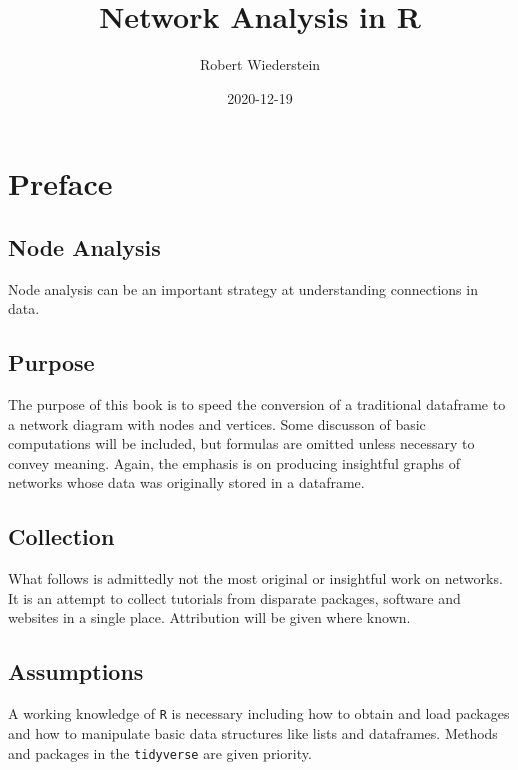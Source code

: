 \documentclass[]{book}
\title{Network Analysis in R}
\author{Robert Wiederstein}
\date{2020-12-19}
\begin{document}
\maketitle

{
\setcounter{tocdepth}{1}
\tableofcontents
}
\hypertarget{preface}{%
\chapter*{Preface}\label{preface}}

\hypertarget{node-analysis}{%
\section{Node Analysis}\label{node-analysis}}

Node analysis can be an important strategy at understanding connections in data.

\hypertarget{purpose}{%
\section{Purpose}\label{purpose}}

The purpose of this book is to speed the conversion of a traditional dataframe to a network diagram with nodes and vertices. Some discusson of basic computations will be included, but formulas are omitted unless necessary to convey meaning. Again, the emphasis is on producing insightful graphs of networks whose data was originally stored in a dataframe.

\hypertarget{collection}{%
\section{Collection}\label{collection}}

What follows is admittedly not the most original or insightful work on networks. It is an attempt to collect tutorials from disparate packages, software and websites in a single place. Attribution will be given where known.

\hypertarget{assumptions}{%
\section{Assumptions}\label{assumptions}}

A working knowledge of \texttt{R} is necessary including how to obtain and load packages and how to manipulate basic data structures like lists and dataframes. Methods and packages in the \texttt{tidyverse} are given priority.
\end{document}
